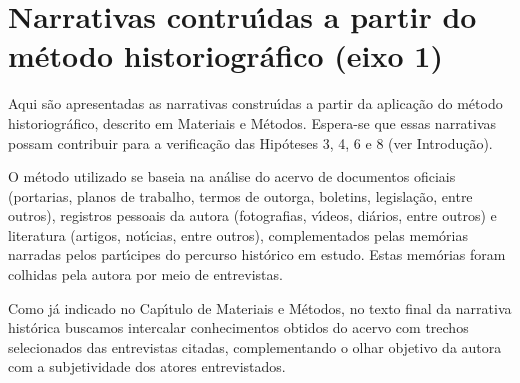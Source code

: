 \documentclass[
12pt,		%
openright,	%
twoside,  %
a4paper,			%
chapter=TITLE,		%
english,			%
french,				%
spanish,			%
brazil				%
]{USPSC-classe/USPSC}
\begin{document}
\section[Narrativas contru\'{\i}das a partir do m\'etodo historiogr\'afico (eixo 1)]{Narrativas contru\'{\i}das a partir do m\'etodo historiogr\'afico (eixo 1)}\label{Narrativas contru\'{\i}das a partir do m\'etodo historiogr\'afico (eixo 1)}
Aqui s\~ao apresentadas as narrativas constru\'{\i}das a partir da aplica\c{c}\~ao do m\'etodo historiogr\'afico, descrito em Materiais e M\'etodos. Espera-se que essas narrativas possam contribuir para a verifica\c{c}\~ao das Hip\'oteses 3, 4, 6 e 8 (ver Introdu\c{c}\~ao).

















O m\'etodo utilizado se baseia na an\'alise do acervo de documentos oficiais (portarias, planos de trabalho, termos de outorga, boletins, legisla\c{c}\~ao, entre outros), registros pessoais da autora (fotografias, v\'{\i}deos, di\'arios, entre outros) e literatura (artigos, not\'{\i}cias, entre outros), complementados pelas mem\'orias narradas pelos part\'{\i}cipes do percurso hist\'orico em estudo. Estas mem\'orias foram colhidas pela autora por meio de entrevistas.

















Como j\'a indicado no Cap\'{\i}tulo de Materiais e M\'etodos, no texto final da narrativa hist\'orica buscamos intercalar conhecimentos obtidos do acervo com trechos selecionados das entrevistas citadas, complementando o olhar objetivo da autora com a subjetividade dos atores entrevistados.
\end{document}
